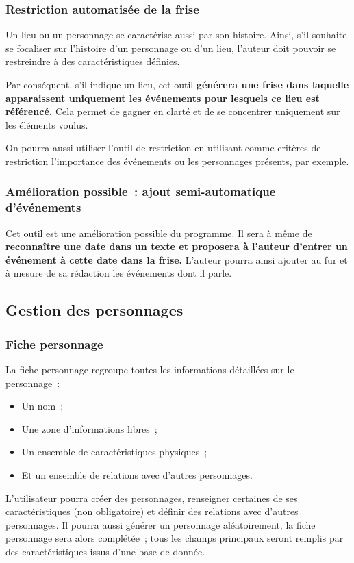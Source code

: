 \documentclass[a4paper,11pt,twoside]{article}
\begin{document}
\subsubsection{Restriction automatisée de la frise}
Un lieu ou un personnage se caractérise aussi par son histoire. Ainsi, s'il souhaite se focaliser sur l'histoire d'un personnage ou d'un lieu, l'auteur doit pouvoir se restreindre à des caractéristiques définies.

Par conséquent, s'il indique un lieu, cet outil \textbf{générera une frise dans laquelle apparaissent uniquement les événements pour lesquels ce lieu est référencé.} Cela permet de gagner en clarté et de se concentrer uniquement sur les éléments voulus.

On pourra aussi utiliser l'outil de restriction en utilisant comme critères de restriction l'importance des événements ou les personnages présents, par exemple.

\subsubsection{Amélioration possible~: ajout semi-automatique d'événements}
Cet outil est une amélioration possible du programme. Il sera à même de \textbf{reconnaître une date dans un texte et proposera à l'auteur d'entrer un événement à cette date dans la frise.} L'auteur pourra ainsi ajouter au fur et à mesure de sa rédaction les événements dont il parle.

\subsection{Gestion des personnages}
\subsubsection{Fiche personnage}
La fiche personnage regroupe toutes les informations détaillées sur le personnage~:
\begin{itemize}
	\item Un nom~;
    \item Une zone d'informations libres~;
    \item Un ensemble de caractéristiques physiques~;
    \item Et un ensemble de relations avec d'autres personnages.
\end{itemize}

L'utilisateur pourra créer des personnages, renseigner certaines de ses caractéristiques (non obligatoire) et définir des relations avec d'autres personnages. Il pourra aussi générer un personnage aléatoirement, la fiche personnage sera alors complétée~; tous les champs principaux seront remplis par des caractéristiques issus d'une base de donnée. 
\end{document}
